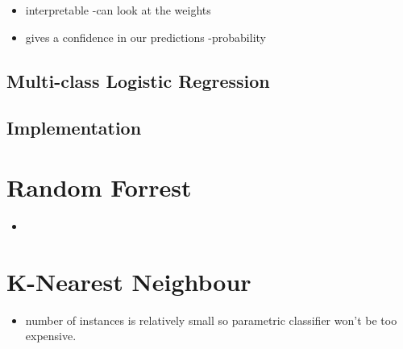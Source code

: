 \begin{itemize}
\item interpretable -can look at the weights
\item gives a confidence in our predictions -probability
\end{itemize}

\subsection{Multi-class Logistic Regression}

\subsection{Implementation}

\section{Random Forrest}

\begin{itemize}
\item
\end{itemize}



\section{K-Nearest Neighbour}


\begin{itemize}
\item number of instances is relatively small so parametric classifier won't be too expensive. 
\end{itemize}
